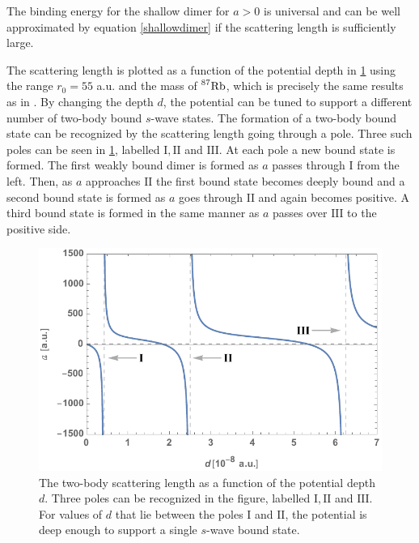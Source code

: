 The binding energy for the shallow dimer for $a>0$ is universal and can be well approximated by equation \eqref{shallowdimer} if the scattering length is sufficiently large.

The scattering length is plotted as a function of the potential depth in \cref{fig:res_1} using the range $r_0=55 $ a.u. and the mass of $ \prescript{87}{}{\mathrm{Rb}}$, which is precisely the same results as in \cite{Blume2002}. By changing the depth $d$, the potential can be tuned to support a different number of two-body bound $s$-wave states. The formation of a two-body bound state can be recognized by the scattering length going through a pole. Three such poles can be seen in \cref{fig:res_1}, labelled $\mathrm{I},\mathrm{II}$ and $\mathrm{III}$. At each pole a new bound state is formed. The first weakly bound dimer is formed as $a$ passes through $\mathrm{I}$ from the left. Then, as $a$ approaches $\mathrm{II}$ the first bound state becomes deeply bound and a second bound state is formed as $a$ goes through $\mathrm{II}$ and again becomes positive. A third bound state is formed in the same manner as $a$ passes over $\mathrm{III}$ to the positive side.

\begin{figure}[b!]
	\includegraphics[width=\linewidth]{scattering_new.pdf}
	\caption{The two-body scattering length as a function of the potential depth $d$. Three poles can be recognized in the figure, labelled $\mathrm{I},\mathrm{II}$ and $\mathrm{III}$. For values of $d$ that lie between the poles $\mathrm{I}$ and $\mathrm{II}$, the potential is deep enough to support a single $s$-wave bound state.}
	\label{fig:res_1}
\end{figure}

